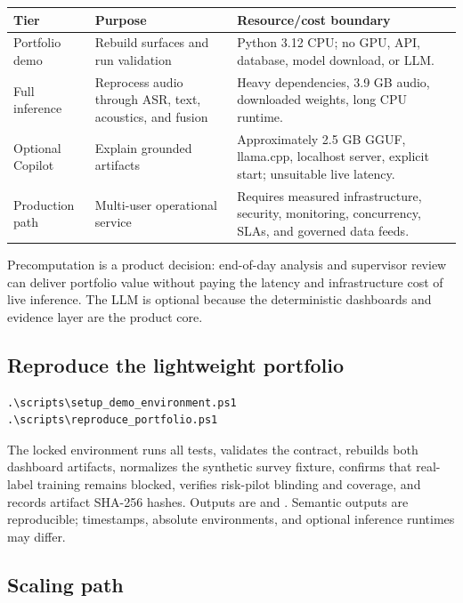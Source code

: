 \documentclass[11pt,letterpaper]{article}
\begin{document}
\begin{center}\small
\begin{tabular}{p{}p{}p{}}
\toprule
Tier & Purpose & Resource/cost boundary \\
\midrule
Portfolio demo & Rebuild surfaces and run validation & Python 3.12 CPU; no GPU, API,
database, model download, or LLM. \\
Full inference & Reprocess audio through ASR, text, acoustics, and fusion & Heavy
dependencies, 3.9 GB audio, downloaded weights, long CPU runtime. \\
Optional Copilot & Explain grounded artifacts & Approximately 2.5 GB GGUF, llama.cpp,
localhost server, explicit start; unsuitable live latency. \\
Production path & Multi-user operational service & Requires measured infrastructure,
security, monitoring, concurrency, SLAs, and governed data feeds. \\
\bottomrule
\end{tabular}
\end{center}

Precomputation is a product decision: end-of-day analysis and supervisor review can
deliver portfolio value without paying the latency and infrastructure cost of live
inference. The LLM is optional because the deterministic dashboards and evidence layer
are the product core.

\subsection{Reproduce the lightweight portfolio}

\begin{verbatim}
.\scripts\setup_demo_environment.ps1
.\scripts\reproduce_portfolio.ps1
\end{verbatim}

The locked environment runs all tests, validates the contract, rebuilds both dashboard
artifacts, normalizes the synthetic survey fixture, confirms that real-label training
remains blocked, verifies risk-pilot blinding and coverage, and records artifact
SHA-256 hashes. Outputs are  and
. Semantic outputs are reproducible; timestamps,
absolute environments, and optional inference runtimes may differ.

\subsection{Scaling path}
\end{document}
